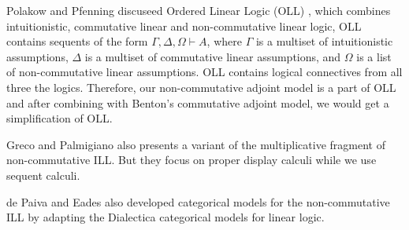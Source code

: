Polakow and Pfenning discuseed Ordered Linear Logic (OLL) \cite{}, which combines
intuitionistic, commutative linear and non-commutative linear logic, OLL contains sequents of
the form $\Gamma,\Delta,\Omega\vdash A$, where $\Gamma$ is a multiset of intuitionistic
assumptions, $\Delta$ is a multiset of commutative linear assumptions, and $\Omega$ is a list of
non-commutative linear assumptions. OLL contains logical connectives from all three the logics.
Therefore, our non-commutative adjoint model is a part of OLL and after combining with Benton's
commutative adjoint model, we would get a simplification of OLL.

Greco and Palmigiano \cite{} also presents a variant of the multiplicative fragment of
non-commutative ILL. But they focus on proper display calculi while we use sequent calculi.

de Paiva and Eades \cite{} also developed categorical models for the non-commutative ILL by
adapting the Dialectica categorical models for linear logic. 
